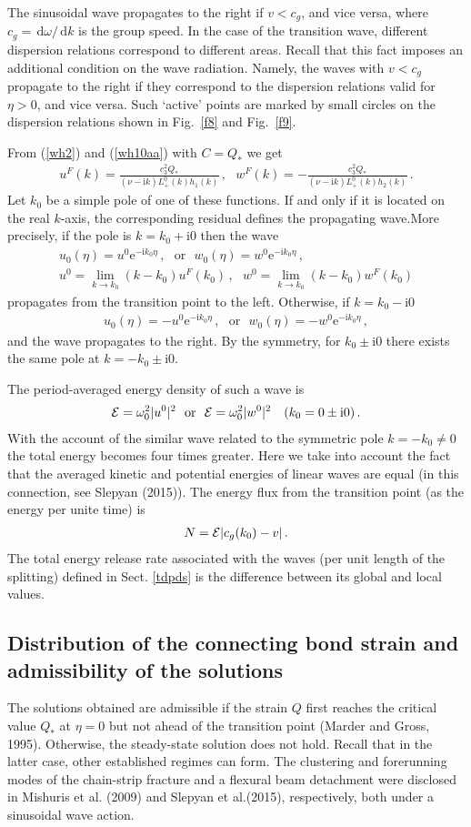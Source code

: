 \documentclass[12pt]{article}
\newcommand{\f}{\frac}
\newcommand{\n}{\nonumber \\}
\newcommand{\beq}{\begin{eqnarray}}
\newcommand{\eeq}[1]{\label{#1}\end{eqnarray}}
\newcommand\eq[1]{(\ref{#1})}
\newcommand\fig[1]{Fig.~\ref{#1}}
\newcommand{\CE}{{\cal E}}
\newcommand{\Gn}{\eta}
\newcommand{\Go}{\omega}
\newcommand{\az}[1]{Sect.$\!$ \ref{#1}}
\newcommand\D{\,\mathrm{d}}
\newcommand\I{\mathrm{i}}
\newcommand\E{\mathrm{e}}
\begin{document}
The sinusoidal wave propagates to the right if $v<c_g$, and vice versa, where $c_g=\D\Go/\D k$ is the group speed. In the case of the transition wave, different dispersion relations correspond to different areas. Recall that this fact imposes an additional condition on the wave radiation. Namely, the waves with $v<c_g$ propagate to the right if they correspond to the dispersion relations valid for $\Gn>0$, and vice versa. Such `active' points are marked by small circles on the dispersion relations shown in \fig{f8} and \fig{f9}.

From \eq{wh2} and \eq{wh10aa} with $C=Q_*$ we get
\beq u^F(k) = \f{c_3^2Q_*}{(\nu-\I k)L^0_+(k)h_1(k)}\,,~~~ w^F(k) =- \f{c_3^2Q_*}{(\nu-\I k)L^0_+(k)h_2(k)}\,.\eeq{rw1}
Let $k_0$ be a simple pole of one of these functions. If and only if it is located on the real $k$-axis, the corresponding residual defines the propagating wave.More precisely, if the pole is $k=k_0 + \I 0$ then the wave
\beq u_0(\Gn) = u^0\E^{-\I k_0\Gn}\,,~~~\mbox{or}~~~w_0(\Gn) = w^0\E^{-\I k_0\Gn}\,,\n u^0=  \lim_{k\to k_0}(k-k_0)u^F(k_0)\,,~~~w^0= \lim_{k\to k_0}(k-k_0)w^F(k_0)\eeq{rw2}
propagates from the transition point to the left. Otherwise, if $k=k_0-\I 0$
\beq  u_0(\Gn) = -u^0\E^{-\I k_0\Gn}\,,~~~\mbox{or}~~~w_0(\Gn) = - w^0\E^{-\I k_0\Gn}\,,\eeq{rw3}
and the wave propagates to the right. By the symmetry, for $k_0\pm \I0$ there exists the same pole at $k= - k_0 \pm \I 0$.

The period-averaged energy density of such a wave is
\beq \CE=\Go_0^2|u^0|^2~~\mbox{or}~~\CE=\Go_0^2|w^0|^2~~~(k_0=0\pm\I 0)\,.\eeq{rw4a}
With the account of the similar wave related to the symmetric pole $ k=- k_0\ne 0$ the total energy becomes four times greater. Here we take into account the fact that the averaged kinetic and potential energies of linear waves are equal (in this connection, see Slepyan (2015)). The energy flux from the transition point (as the energy per unite time) is
\beq N = \CE |c_g(k_0) - v|\,.\eeq{rw5}
The total energy release rate associated with the waves (per unit length of the splitting) defined in \az{tdpds} is the difference between its global and local values.

\subsection{Distribution of the connecting bond strain and admissibility of the solutions}\label{aots}
The solutions obtained are admissible if the strain  $Q$ first reaches the critical value $Q_*$ at $\Gn=0$ but not ahead of the transition point (Marder and Gross, 1995). Otherwise,  the steady-state solution does not hold. Recall that in the latter case, other established regimes can form. The clustering and forerunning modes of the chain-strip fracture and a flexural beam detachment were disclosed in Mishuris et al. (2009) and Slepyan et al.(2015), respectively, both under a sinusoidal wave action.
\end{document}
